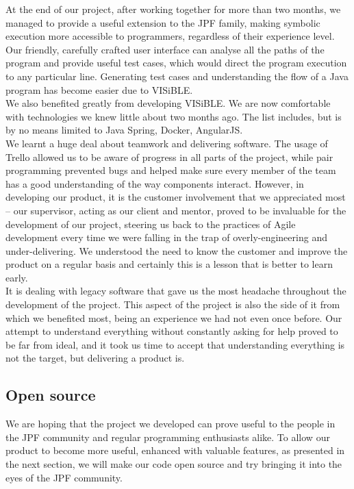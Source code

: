 \documentclass[titlepage,11pt]{article}
\begin{document}
At the end of our project, after working together for more than two months, we managed to provide a useful extension to the JPF family, making symbolic execution more accessible to programmers, regardless of their experience level. \\

Our friendly, carefully crafted user interface can analyse all the paths of the program and provide useful test cases, which would direct the program execution to any particular line. Generating test cases and understanding the flow of a Java program has become easier due to VISiBLE. \\

We also benefited greatly from developing VISiBLE.
We are now comfortable with technologies we knew little about two months ago. The list includes, but is by no means limited to Java Spring, Docker, AngularJS. \\

We learnt a huge deal about teamwork and delivering software. The usage of Trello allowed us to be aware of progress in all parts of the project, while pair programming prevented bugs and helped make sure every member of the team has a good understanding of the way components interact. However, in developing our product, it is the customer involvement that we appreciated most -- our supervisor, acting as our client and mentor, proved to be invaluable for the development of our project, steering us back to the practices of Agile development every time we were falling in the trap of overly-engineering and under-delivering. We understood the need to know the customer and improve the product on a regular basis and certainly this is a lesson that is better to learn early. \\

It is dealing with legacy software that gave us the most headache throughout the development of the project. This aspect of the project is also the side of it from which we benefited most, being an experience we had not even once before. Our attempt to understand everything without constantly asking for help proved to be far from ideal, and it took us time to accept that understanding everything is not the target, but delivering a product is.

\subsection{Open source}

We are hoping that the project we developed can prove useful to the people in the JPF community and regular programming enthusiasts alike. To allow our product to become more useful, enhanced with valuable features, as presented in the next section, we will make our code open source and try bringing it into the eyes of the JPF community. \\
\end{document}
